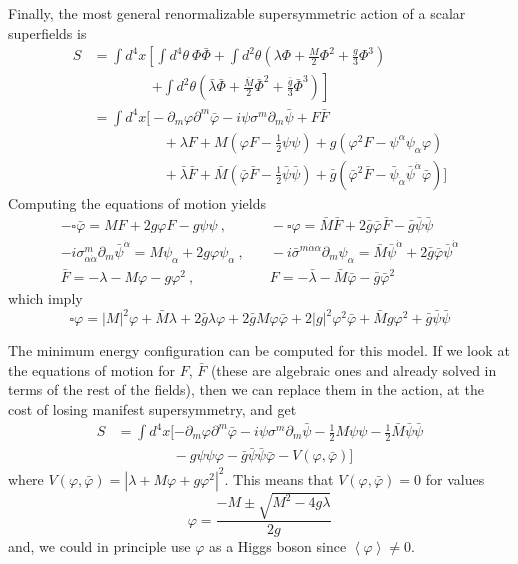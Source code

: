 \documentclass[a4paper,12pt]{article}
\numberwithin{equation}{section}
\numberwithin{exe}{section}
\newcommand{\p}{{\partial}}
\newcommand{\Fb}{{\bar F}}
\renewcommand{\a}{{\alpha}}
\newcommand{\ad}{{\dot\alpha}}
\renewcommand{\l}{{\lambda}}
\newcommand{\lb}{{\bar\lambda}}
\newcommand{\s}{{\sigma}}
\renewcommand{\sb}{{\bar\sigma}}
\renewcommand{\t}{{\theta}}
\newcommand{\vphi}{{\varphi}}
\newcommand{\vphib}{{\bar\varphi}}
\newcommand{\Phib}{{\bar \Phi}}
\newcommand{\psib}{{\bar\psi}}
\begin{document}
Finally, the most general renormalizable supersymmetric action of a scalar superfields is
	\begin{align}
	S & = \int d^4 x \left[ \int d^4\t\ \Phi\Phib + \int d^2\t \left(\l\Phi + \frac{M}{2} \Phi^2 + \frac{g}{3}\Phi^3\right) \right. \nonumber \\
	& \qquad\qquad\ \left. + \int d^2\t\left(\bar\l \Phib + \frac{\bar M}{2}\Phib^2 + \frac{\bar g}{3}\Phib^3\right)\right] \nonumber \\
	& = \int d^4 x \Big[ - \p_m\vphi\p^m\vphib - i\psi\s^m\p_m\psib + F\Fb \nonumber \\
	& \qquad\qquad\quad + \l F + M(\vphi F-\frac12\psi\psi) + g(\vphi^2 F - \psi^\a\psi_\a \vphi) \nonumber \\
	& \qquad\qquad\quad + \lb\Fb + \bar M(\vphib\Fb - \frac12\psib\psib) + \bar g(\vphib^2\Fb - \psib_\ad\psib^\ad\vphib)\Big] \label{star22}
	\end{align}
Computing the equations of motion yields
	\begin{equation}\label{star11}
		\begin{aligned}
		-\square\vphib = MF + 2g\vphi F - g\psi\psi\ ,&\quad -\square\vphi = \bar M\Fb + 2\bar g\vphib\Fb - \bar g\psib\psib \\
		-i\s^m_{\a\ad}\p_m\psib^\ad = M\psi_\a + 2g\vphi\psi_\a\ ,&\quad -i\sb^{m\ad\a}\p_m\psi_\a = \bar M\psib^\ad + 2\bar g\vphib\psib^\ad \\
		\Fb = -\l-M\vphi - g\vphi^2\ ,&\quad F = -\lb - \bar M\vphib - \bar g\vphib^2
		\end{aligned}
	\end{equation}
which imply
	\begin{equation}
	\square\vphi = |M|^2\vphi + \bar M\l + 2\bar g\l\vphi + 2\bar g M\vphi\vphib + 2|g|^2 \vphi^2 \vphib +\bar M g\vphi^2 + \bar g\psib\psib
	\end{equation}

The minimum energy configuration can be computed for this model. If we look at the equations of motion for $F$, $\Fb$ (these are algebraic ones and already solved in terms of the rest of the fields), then we can replace them in the action, at the cost of losing manifest supersymmetry, and get
	\begin{align}
	S & = \int d^4 x [-\p_m\vphi\p^m\vphib - i\psi\s^m\p_m\psib - \frac12M\psi\psi - \frac12\bar M\psib\psib \nonumber \\
	& \qquad\qquad -g\psi\psi\vphi - \bar g\psib\psib\vphib - V(\vphi,\vphib)]
	\end{align}
where $V(\vphi,\vphib) = |\l + M \vphi + g\vphi^2|^2$. This means that $V(\vphi,\vphib)=0$ for values
	\begin{equation}
	 \vphi = \frac{-M\pm\sqrt{M^2-4g\l}}{2g}
	\end{equation}
and, we could in principle use $\vphi$ as a Higgs boson since $\left<\vphi\right> \neq 0$.
\end{document}
